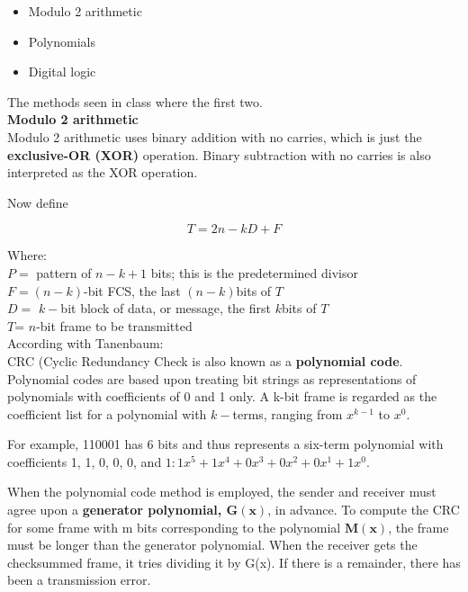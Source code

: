 \begin{itemize}
	\item Modulo 2 arithmetic
	\item Polynomials
	\item Digital logic
\end{itemize}

The methods seen in class where the first two.\\


\textbf{Modulo 2 arithmetic}\\

Modulo 2 arithmetic uses binary addition with no carries,
which is just the \textbf{ exclusive-OR (XOR)} operation. Binary subtraction with no carries
is also interpreted as the XOR operation.

Now define

\begin{equation*}
	T = 2n-kD + F
\end{equation*}

Where: \\
$P =$ pattern of $n - k + 1$ bits; this is the predetermined divisor\\
$F = (n - k)$-bit FCS, the last $(n - k) $bits of $T$\\
$D =$ $k-$bit block of data, or message, the first $k $bits of $T$\\
$T$= $n$-bit frame to be transmitted \\

According with Tanenbaum: \cite{tanenbaumwetherall2014}  \\

CRC (Cyclic Redundancy Check is  also known
as a \textbf{polynomial code}. Polynomial codes are based upon treating bit strings as
representations of polynomials with coefficients of 0 and 1 only. A k-bit frame is
regarded as the coefficient list for a polynomial with $k-$terms, ranging from $x^{k-1}$
to $x^0$.

For example, 110001 has 6 bits and thus represents a six-term polynomial with
coefficients 1, 1, 0, 0, 0, and $ 1: 1x^5 + 1x^4 + 0x^3 + 0x^2 + 0x^1 + 1x^0.$

When the polynomial code method is employed, the sender and receiver must
agree upon a \textbf{ generator polynomial, $\mathbf{G(x)}$}, in advance.  To compute the CRC for some frame with
m bits corresponding to the polynomial $ \mathbf{M(x)}$, the frame must be longer than the
generator polynomial.  When the receiver gets the checksummed frame, it tries dividing it
by G(x). If there is a remainder, there has been a transmission error.

